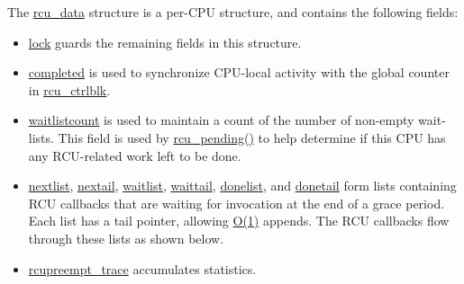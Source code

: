 The \url{rcu_data} structure is a per-CPU structure, and
contains the following fields:

\begin{itemize}
\item	\url{lock} guards the remaining fields in this structure.
\item	\url{completed} is used to synchronize CPU-local
	activity with the global counter in \url{rcu_ctrlblk}.
\item	\url{waitlistcount} is used to maintain a count of the
	number of non-empty wait-lists.
	This field is used by \url{rcu_pending()} to help determine
	if this CPU has any RCU-related work left to be done.
\item	\url{nextlist}, \url{nextail}, \url{waitlist},
	\url{waittail}, \url{donelist}, and
	\url{donetail} form lists containing
	RCU callbacks that are waiting for invocation at the end
	of a grace period.
	Each list has a tail pointer, allowing \url{O(1)} appends.
	The RCU callbacks flow through these lists as shown below.
\item	\url{rcupreempt_trace} accumulates statistics.
\end{itemize}


